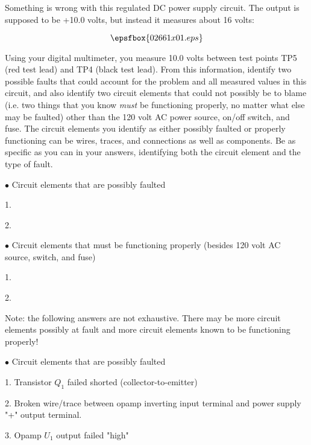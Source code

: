 

Something is wrong with this regulated DC power supply circuit.  The output is supposed to be +10.0 volts, but instead it measures about 16 volts:

$$\epsfbox{02661x01.eps}$$

Using your digital multimeter, you measure 10.0 volts between test points TP5 (red test lead) and TP4 (black test lead).  From this information, identify two possible faults that could account for the problem and all measured values in this circuit, and also identify two circuit elements that could not possibly be to blame (i.e. two things that you know {\it must} be functioning properly, no matter what else may be faulted) other than the 120 volt AC power source, on/off switch, and fuse.  The circuit elements you identify as either possibly faulted or properly functioning can be wires, traces, and connections as well as components.  Be as specific as you can in your answers, identifying both the circuit element and the type of fault.

\medskip
\goodbreak
\item{$\bullet$} Circuit elements that are possibly faulted
\item{1.}
\item{2.} 
\medskip

\medskip
\goodbreak
\item{$\bullet$} Circuit elements that must be functioning properly (besides 120 volt AC source, switch, and fuse)
\item{1.} 
\item{2.} 
\medskip







Note: the following answers are not exhaustive.  There may be more circuit elements possibly at fault and more circuit elements known to be functioning properly!

\medskip
\goodbreak
\item{$\bullet$} Circuit elements that are possibly faulted
\item{1.} Transistor $Q_1$ failed shorted (collector-to-emitter)
\item{2.} Broken wire/trace between opamp inverting input terminal and power supply "+" output terminal.
\item{3.} Opamp $U_1$ output failed "high"
\medskip

